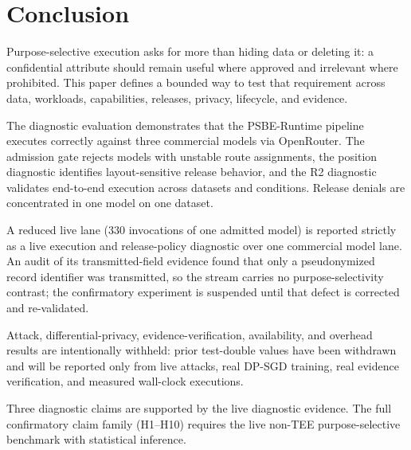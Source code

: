 \section{Conclusion}

Purpose-selective execution asks for more than hiding data or deleting it: a
confidential attribute should remain useful where approved and irrelevant where
prohibited. This paper defines a bounded way to test that requirement across
data, workloads, capabilities, releases, privacy, lifecycle, and evidence.

The diagnostic evaluation demonstrates that the PSBE-Runtime pipeline executes
correctly against three commercial models via OpenRouter. The admission gate
rejects models with unstable route assignments, the position diagnostic
identifies layout-sensitive release behavior, and the R2 diagnostic
validates end-to-end execution across datasets and conditions. Release
denials are concentrated in one model on one dataset.

A reduced live lane (330 invocations of one admitted model) is reported
strictly as a live execution and release-policy diagnostic over one
commercial model lane. An audit of its transmitted-field evidence found that
only a pseudonymized record identifier was transmitted, so the stream carries
no purpose-selectivity contrast; the confirmatory experiment is suspended
until that defect is corrected and re-validated.

Attack, differential-privacy, evidence-verification, availability, and
overhead results are intentionally withheld: prior test-double values have
been withdrawn and will be reported only from live attacks, real DP-SGD
training, real evidence verification, and measured wall-clock executions.

Three diagnostic claims are supported by the live diagnostic evidence. The
full confirmatory claim family (H1--H10) requires the live non-TEE
purpose-selective benchmark with statistical inference.
